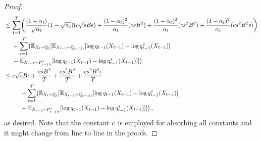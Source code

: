 \begin{proof}
\begin{align*}
    &\le \sum_{t=1}^{T}\biggl(\frac{(1-\alpha_t)}{\sqrt{\alpha_t}}(1-\sqrt{\alpha_t})( c \sqrt{s}B\epsilon)+\frac{(1-\alpha_t)^2}{\alpha_t}(c sB^2) +\frac{(1-\alpha_t)^2}{\alpha_t}(c s^2B^2)+\frac{(1-\alpha_t)^2}{\alpha_t}(c s^2B^2\epsilon)\biggr)\\
    &~~~~+\sum_{t=1}^{T}\bigl(\textcolor{black}{\mathbb{E}}_{X_{t}\sim \mathbb{Q}_{t}}[\textcolor{black}{\mathbb{E}}_{X_{t-1}\sim \mathbb{Q}_{t-1|t}}[\log q_{t-1}(X_{t-1})-\log q^s_{t-1}(X_{t-1})]\\
    &~~~~-\textcolor{black}{\mathbb{E}}_{X_{t-1}\sim P^s_{t-1|t}}[\log q_{t-1}(X_{t-1})-\log q^s_{t-1}(X_{t-1})]]\bigr)\\
&\le c \sqrt{s}B \epsilon+\frac{c sB^2}{T} +\frac{c s^2B^2}{T}+\frac{c s^2B^2\epsilon}{T}\\
    &~~~~~~~~+\sum_{t=1}^{T}\bigl(\textcolor{black}{\mathbb{E}}_{X_{t}\sim \mathbb{Q}_{t}}[\textcolor{black}{\mathbb{E}}_{X_{t-1}\sim \mathbb{Q}_{t-1|t}}[\log q_{t-1}(X_{t-1})-\log q^s_{t-1}(X_{t-1})]\\
    &~~~~~~~~-\textcolor{black}{\mathbb{E}}_{X_{t-1}\sim P^s_{t-1|t}}[\log q_{t-1}(X_{t-1})-\log q^s_{t-1}(X_{t-1})]]\bigr)\,,
   \end{align*}
   \endgroup
as desired.  
Note that the constant $c$ is employed for absorbing all constants and it might change from line to line in the proofs. 
\end{proof}












